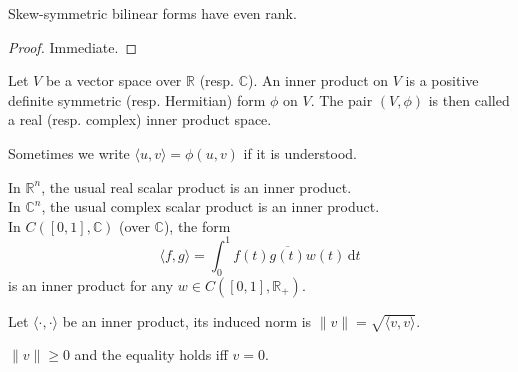 \begin{corollary}
    Skew-symmetric bilinear forms have even rank.
\end{corollary}
\begin{proof}
    Immediate.
\end{proof}
\begin{definition}
    Let $V$ be a vector space over $\mathbb R$ (resp. $\mathbb C$).
    An inner product on $V$ is a positive definite symmetric (resp. Hermitian) form $\phi$ on $V$.
    The pair $(V,\phi)$ is then called a real (resp. complex) inner product space.
\end{definition}
Sometimes we write $\langle u,v\rangle=\phi(u,v)$ if it is understood.
\begin{example}
    In $\mathbb R^n$, the usual real scalar product is an inner product.\\
    In $\mathbb C^n$, the usual complex scalar product is an inner product.\\
    In $C([0,1],\mathbb C)$ (over $\mathbb C$), the form
    $$\langle f,g\rangle=\int_0^1f(t)\overline{g(t)}w(t)\,\mathrm dt$$
    is an inner product for any $w\in C([0,1],\mathbb R_+)$.
\end{example}
\begin{definition}
    Let $\langle\cdot,\cdot\rangle$ be an inner product, its induced norm is $\|v\|=\sqrt{\langle v,v\rangle}$.
\end{definition}
\begin{remark}
    $\|v\|\ge 0$ and the equality holds iff $v=0$.
\end{remark}